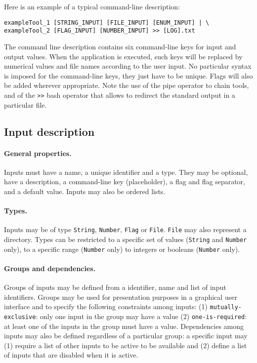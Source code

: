 \documentclass{article}
\begin{document}
Here is an example of a typical command-line description:
\begin{verbatim}
exampleTool_1 [STRING_INPUT] [FILE_INPUT] [ENUM_INPUT] | \
exampleTool_2 [FLAG_INPUT] [NUMBER_INPUT] >> [LOG].txt
\end{verbatim}
The command line description contains six command-line keys for input
and output values. When the application is executed, such keys will be
replaced by numerical values and file names according to the user
input. No particular syntax is imposed for the command-line keys, they
just have to be unique. Flags will also be added wherever
appropriate. Note the use of the pipe operator to chain tools, and of
the \texttt{>>} bash operator that allows to redirect the standard
output in a particular file.

\subsection{Input description}

\paragraph{General properties.} Inputs must have a name, a unique
identifier and a type. They may be optional, have a description, a
command-line key (placeholder), a flag and flag separator, and a
default value. Inputs may also be ordered lists. 

\paragraph{Types.} Inputs may be of type \texttt{String},
\texttt{Number}, \texttt{Flag} or \texttt{File}. \texttt{File} may
also represent a directory. Types can be restricted to a specific set
of values (\texttt{String} and \texttt{Number} only), to a specific
range (\texttt{Number} only) to integers or booleans (\texttt{Number}
only).

\paragraph{Groups and dependencies.} Groups of inputs may be defined
from a identifier, name and list of input identifiers. Groups may be
used for presentation purposes in a graphical user interface and to
specify the following constraints among inputs: (1)
\texttt{mutually-exclusive}: only one input in the group may have a
value (2) \texttt{one-is-required}: at least one of the inputs in the
group must have a value. Dependencies among inputs may also be defined
regardless of a particular group: a specific input may (1) require a
list of other inputs to be active to be available and (2) define a
list of inputs that are disabled when it is active.
\end{document}
